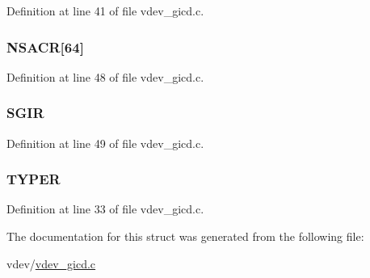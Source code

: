 \-Definition at line 41 of file vdev\-\_\-gicd.\-c.

\hypertarget{structgicd__regs_aed48e259a313de526bb0debcf3a99678}{
\subsubsection[{\-N\-S\-A\-C\-R}]{ {\bf \-N\-S\-A\-C\-R}\mbox{[}64\mbox{]}}}\label{structgicd__regs_aed48e259a313de526bb0debcf3a99678}


\-Definition at line 48 of file vdev\-\_\-gicd.\-c.

\hypertarget{structgicd__regs_ad468da6adc4ae9617d3b149a7672ac54}{
\subsubsection[{\-S\-G\-I\-R}]{ {\bf \-S\-G\-I\-R}}}\label{structgicd__regs_ad468da6adc4ae9617d3b149a7672ac54}


\-Definition at line 49 of file vdev\-\_\-gicd.\-c.

\hypertarget{structgicd__regs_add1b2ee4539697cfcd41ac08d60dc781}{
\subsubsection[{\-T\-Y\-P\-E\-R}]{ {\bf \-T\-Y\-P\-E\-R}}}\label{structgicd__regs_add1b2ee4539697cfcd41ac08d60dc781}


\-Definition at line 33 of file vdev\-\_\-gicd.\-c.



\-The documentation for this struct was generated from the following file\-:\begin{DoxyCompactItemize}
\item 
vdev/\hyperlink{vdev__gicd_8c}{vdev\-\_\-gicd.\-c}\end{DoxyCompactItemize}
